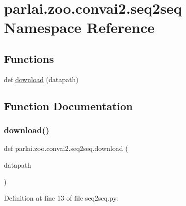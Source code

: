 \hypertarget{namespaceparlai_1_1zoo_1_1convai2_1_1seq2seq}{}\section{parlai.\+zoo.\+convai2.\+seq2seq Namespace Reference}
\label{namespaceparlai_1_1zoo_1_1convai2_1_1seq2seq}
\subsection*{Functions}
\begin{DoxyCompactItemize}
\item 
def \hyperlink{namespaceparlai_1_1zoo_1_1convai2_1_1seq2seq_a85645a8dbd4e8a3d67f8acb231de4f6b}{download} (datapath)
\end{DoxyCompactItemize}


\subsection{Function Documentation}
\mbox{\label{namespaceparlai_1_1zoo_1_1convai2_1_1seq2seq_a85645a8dbd4e8a3d67f8acb231de4f6b}} 
\subsubsection{\texorpdfstring{download()}{download()}}
{\footnotesize\ttfamily def parlai.\+zoo.\+convai2.\+seq2seq.\+download (\begin{DoxyParamCaption}\item[{}]{datapath }\end{DoxyParamCaption})}



Definition at line 13 of file seq2seq.\+py.


